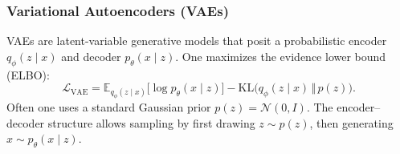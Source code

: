 \documentclass[sigconf]{acmart}
\begin{document}
    \subsubsection{Variational Autoencoders (VAEs)}
    VAEs \cite{kingma2022vae, 
    rezende2014stochastic} are latent-variable generative models 
    that posit a probabilistic encoder \(q_\phi(z \mid x)\) and 
    decoder \(p_\theta(x \mid z)\). One maximizes the evidence 
    lower bound (ELBO):
    \[
    \mathcal{L}_{\text{VAE}} = \mathbb{E}_{q_\phi(z \mid x)}
    \bigl[\log p_\theta(x \mid z)\bigr] - \mathrm{KL}\bigl(
    q_\phi(z \mid x)\,\Vert\,p(z)\bigr).
    \]
    Often one uses a standard Gaussian prior \(p(z) = 
    \mathcal{N}(0, I)\). The encoder–decoder structure allows 
    sampling by first drawing \(z \sim p(z)\), then generating 
    \(x \sim p_\theta(x \mid z)\).
    
\end{document}
